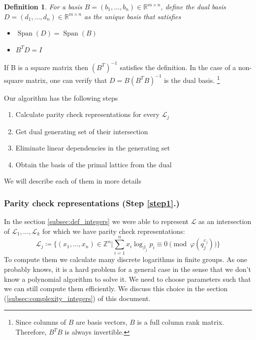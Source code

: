 \documentclass[12pt]{article}
\newcommand{\ZZ}{\mathbb{Z}}
\newcommand{\LL}{\mathcal{L}}
\DeclareMathOperator{\Span}{Span}
\newtheorem{definition}{Definition}
\begin{document}
\begin{definition}\label{def:dual_basis}
    For a basis $B = (b_{1}, \dots, b_{n}) \in \mathbb{R}^{m \times n}$, define the dual basis $D = (d_{1}, \dots, d_{n}) \in \mathbb{R}^{m \times n}$ as the unique basis that satisfies
    \begin{itemize}
        \item $\Span(D) = \Span(B)$
        \item $B^{T}D = I$
    \end{itemize}
\end{definition}
If B is a square matrix then $(B^{T})^{-1}$ satisfies the definition. In the case of a non-square matrix, one can verify that $D = B(B^{T}B)^{-1}$ is the dual basis. \footnote{Since columns of $B$ are basis vectors, $B$ is a full column rank matrix. Therefore, $B^{T}B$ is always invertible.}

 Our algorithm \label{algorithm} has the following steps
\begin{enumerate}
    \item \label{step1} Calculate parity check representations for every $\LL_{j}$
    \item \label{step2} Get dual generating set of their intersection
    \item \label{step3} Eliminate linear dependencies in the generating set
    \item \label{step4} Obtain the basis of the primal lattice from the dual
\end{enumerate}
We will describe each of them in more details

\subsubsection{Parity check representations (Step \ref{step1}.)}
\label{subsubsec:parity_check_repr}
In the section \ref{subsec:def_integers} we were able to represent $\LL$ as an intersection of $\LL_{1}, \dots, \LL_{k}$ for which we have parity check representations:
\[
    \LL_{j} \coloneqq \{(x_{1}, \dots, x_{n}) \in \ZZ^{n} | \sum_{i=1}^{n}x_{i}\log_{\beta_{j}}p_{i}\equiv 0 \pmod{\varphi(q_{j}^{e_{j}})}\}
\]
To compute them we calculate many discrete logarithms in finite groups. As one probably knows, it is a hard problem for a general case in the sense that we don't know a polynomial algorithm to solve it. We need to choose parameters such that we can still compute them efficiently. We discuss this choice in the section (\ref{subsec:complexity_integers}) of this document.
\end{document}
